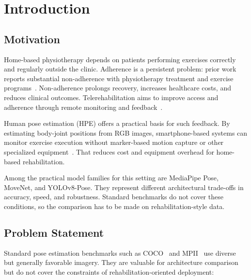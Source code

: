 \chapter{Introduction}
\label{ch:introduction}


\section{Motivation}
\label{sec:motivation}

Home-based physiotherapy depends on patients performing exercises correctly and regularly outside the clinic. Adherence is a persistent problem: prior work reports substantial non-adherence with physiotherapy treatment and exercise programs~\cite{jack2010barriers}. Non-adherence prolongs recovery, increases healthcare costs, and reduces clinical outcomes. Telerehabilitation aims to improve access and adherence through remote monitoring and feedback~\cite{simmich2024telerehab}.

Human pose estimation (HPE) offers a practical basis for such feedback. By estimating body-joint positions from RGB images, smartphone-based systems can monitor exercise execution without marker-based motion capture or other specialized equipment~\cite{hellsten2021potential}. That reduces cost and equipment overhead for home-based rehabilitation.

Among the practical model families for this setting are MediaPipe Pose, MoveNet, and YOLOv8-Pose. They represent different architectural trade-offs in accuracy, speed, and robustness. Standard benchmarks do not cover these conditions, so the comparison has to be made on rehabilitation-style data.


\section{Problem Statement}
\label{sec:problem-statement}

Standard pose estimation benchmarks such as COCO~\cite{lin2014coco} and MPII~\cite{andriluka2014mpii} use diverse but generally favorable imagery. They are valuable for architecture comparison but do not cover the constraints of rehabilitation-oriented deployment:

